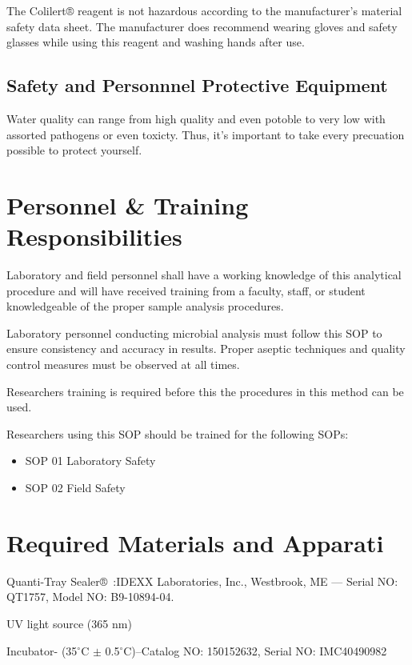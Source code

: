 \documentclass[12pt]{../SOP4_alpha}\usepackage[]{graphicx}\usepackage[]{xcolor}
\begin{document}
\NP The Colilert® reagent is not hazardous according to the manufacturer's material
safety data sheet. The manufacturer does recommend wearing gloves and safety
glasses while using this reagent and washing hands after use. 


\subsection{Safety and Personnnel Protective Equipment}

Water quality can range from high quality and even potoble to very low with assorted pathogens or even toxicty. Thus, it's important to take every precuation possible to protect yourself. 

\section{Personnel \& Training Responsibilities}

\NP Laboratory and field personnel shall have a working knowledge of this analytical procedure and will have received training from a faculty, staff, or student knowledgeable of the proper sample analysis procedures. 

\NP Laboratory personnel conducting microbial analysis must follow this SOP to ensure consistency and accuracy in results. Proper aseptic techniques and quality control measures must be observed at all times.

\NP Researchers training is required before this the procedures in this method can be used.

\NP Researchers using this SOP should be trained for the following SOPs:

\begin{itemize}
  \item SOP 01 Laboratory Safety
  \item SOP 02 Field Safety
\end{itemize}

\section{Required Materials and Apparati}

\NP Quanti-Tray Sealer®\textregistered ~:IDEXX Laboratories, Inc., Westbrook, ME --- Serial NO: QT1757, Model NO: B9-10894-04.

\NP UV light source (365 nm)

\NP Incubator- (35$^{\circ}$C $\pm$ 0.5$^{\circ}$C)--Catalog NO: 150152632, Serial NO: IMC40490982
\end{document}
